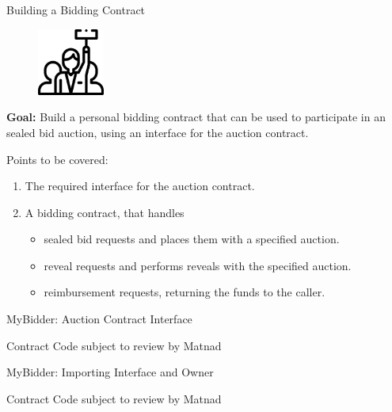 \documentclass[]{beamer}
\begin{document}
\begin{frame}{Building a Bidding Contract}

\begin{minipage}{0.3\textwidth}
	\begin{figure}
		\center
		\includegraphics[width= 2.2cm]{../assets/images/bidder.png}	
	\end{figure}
\end{minipage}
\begin{minipage}{0.65\textwidth}
	\vspace{0.5em}
	\textbf{Goal:} Build a personal bidding contract that can be used to participate in an sealed bid auction, using an interface for the auction contract.\\
\end{minipage}

\vspace{2em}

Points to be covered:
\vspace{0.5em}
\begin{enumerate}
	\item	The required interface for the auction contract.
	\item	A bidding contract, that handles
	\vspace{0.5em}
	\begin{itemize}
		\item sealed bid requests and places them with a specified auction.
		\item reveal requests and performs reveals with the specified auction.
		\item reimbursement requests, returning the funds to the caller.
	\end{itemize}
\end{enumerate}


\end{frame}


\begin{frame}{MyBidder: Auction Contract Interface}

Contract Code subject to review by Matnad

\end{frame}


\begin{frame}{MyBidder: Importing Interface and Owner}

Contract Code subject to review by Matnad

\end{frame}
\end{document}
